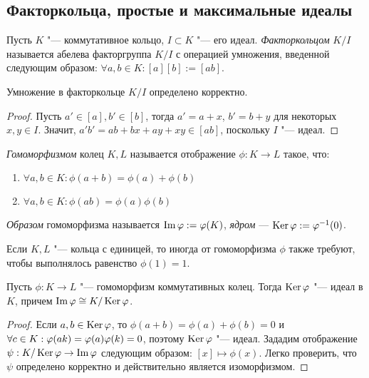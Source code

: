 \subsection{Факторкольца, простые и максимальные идеалы}

\begin{definition}
	Пусть $K$ "--- коммутативное кольцо, $I \subset K$ "--- его идеал. \textit{Факторкольцом} $K / I$ называется абелева факторгруппа $K / I$ с операцией умножения, введенной следующим образом: $\forall a, b \in K: [a][b] := [ab]$.
\end{definition}

\begin{proposition}
	Умножение в факторкольце $K / I$ определено корректно.
\end{proposition}

\begin{proof}
	Пусть $a' \in [a], b' \in [b]$, тогда $a' = a + x$, $b' = b + y$ для некоторых $x, y \in I$. Значит, $a'b' = ab + bx + ay + xy \in [ab]$, поскольку $I$ "--- идеал.
\end{proof}

\begin{definition}
	\textit{Гомоморфизмом} колец $K, L$ называется отображение $\phi: K \to L$ такое, что:
	\begin{enumerate}
		\item $\forall a, b \in K: \phi(a + b) = \phi(a) + \phi(b)$
		\item $\forall a, b \in K: \phi(ab) = \phi(a)\phi(b)$
	\end{enumerate}

	\textit{Образом} гомоморфизма называется $\operatorname{Im}\varphi := \varphi(K)$, \textit{ядром} --- $\operatorname{Ker}\varphi := \varphi^{-1}(0)$.
\end{definition}

\begin{note}
	Если $K, L$ "--- кольца с единицей, то иногда от гомоморфизма $\phi$ также требуют, чтобы выполнялось равенство $\phi(1) = 1$.
\end{note}

\begin{theorem}
	Пусть $\phi : K \to L$ "--- гомоморфизм коммутативных колец. Тогда $\operatorname{Ker}\varphi$ "--- идеал в $K$, причем $\operatorname{Im}\varphi \cong K / \operatorname{Ker}{\varphi}$.
\end{theorem}

\begin{proof}
	Если $a, b \in \operatorname{Ker}\varphi$, то $\phi(a + b) = \phi(a) + \phi(b) = 0$ и $\forall c \in K: \phi(ak) \hm= \phi(a)\phi(k) = 0$, поэтому $\operatorname{Ker}\varphi$ "--- идеал. Зададим отображение $\psi: K/\operatorname{Ker}\varphi \to \operatorname{Im}\varphi$ следующим образом: $[x] \mapsto \phi(x)$. Легко проверить, что $\psi$ определено корректно и действительно является изоморфизмом.
\end{proof}


